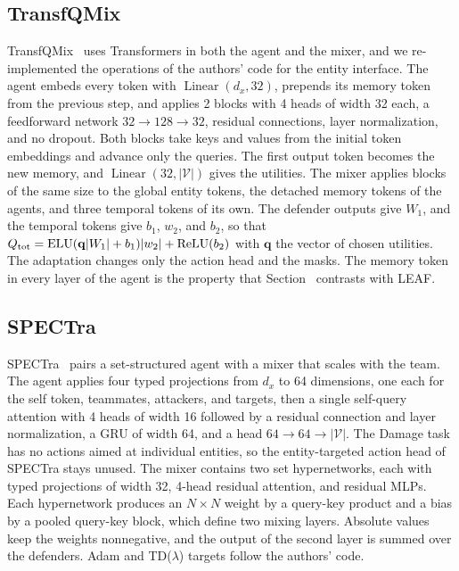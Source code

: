 \subsection{TransfQMix}
TransfQMix~\cite{transfqmix2023} uses Transformers in both the agent and the mixer, and we re-implemented the operations of the authors' code for the entity interface. The agent embeds every token with $\operatorname{Linear}(d_x,32)$, prepends its memory token from the previous step, and applies 2 blocks with 4 heads of width 32 each, a feedforward network $32\to128\to32$, residual connections, layer normalization, and no dropout. Both blocks take keys and values from the initial token embeddings and advance only the queries. The first output token becomes the new memory, and $\operatorname{Linear}(32,|\mathcal V|)$ gives the utilities. The mixer applies blocks of the same size to the global entity tokens, the detached memory tokens of the agents, and three temporal tokens of its own. The defender outputs give $W_1$, and the temporal tokens give $b_1$, $w_2$, and $b_2$, so that $Q_{\rm tot}=\operatorname{ELU}(\mathbf q|W_1|+b_1)|w_2|+\operatorname{ReLU}(b_2)$ with $\mathbf q$ the vector of chosen utilities. The adaptation changes only the action head and the masks. The memory token in every layer of the agent is the property that Section~ contrasts with LEAF.

\subsection{SPECTra}
SPECTra~\cite{park2026spectra} pairs a set-structured agent with a mixer that scales with the team. The agent applies four typed projections from $d_x$ to 64 dimensions, one each for the self token, teammates, attackers, and targets, then a single self-query attention with 4 heads of width 16 followed by a residual connection and layer normalization, a GRU of width 64, and a head $64\to64\to|\mathcal V|$. The Damage task has no actions aimed at individual entities, so the entity-targeted action head of SPECTra stays unused. The mixer contains two set hypernetworks, each with typed projections of width 32, 4-head residual attention, and residual MLPs. Each hypernetwork produces an $N\times N$ weight by a query-key product and a bias by a pooled query-key block, which define two mixing layers. Absolute values keep the weights nonnegative, and the output of the second layer is summed over the defenders. Adam and TD($\lambda$) targets follow the authors' code.

